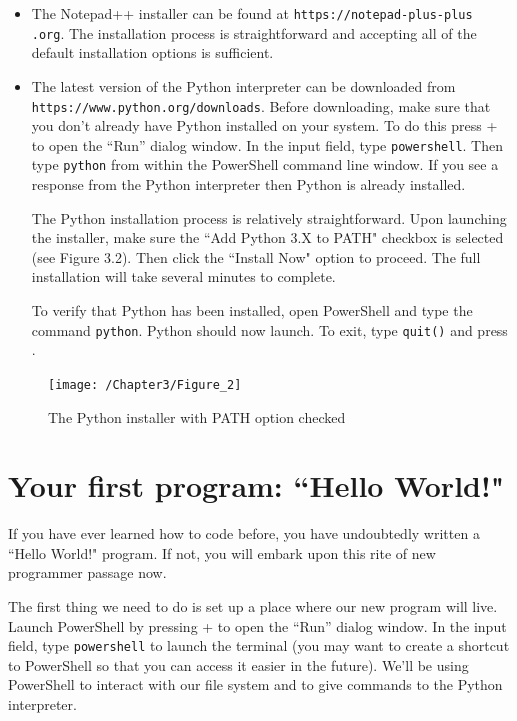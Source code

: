 \documentclass{book}
\begin{document}
\begin{itemize}
	\item The Notepad++ installer can be found at \texttt{https://notepad-plus-plus
		.org}. The installation process is straightforward and accepting all of the default installation options is sufficient.
	\item The latest version of the Python interpreter can be downloaded from 
	\texttt{https://www.python.org/downloads}. Before downloading, make sure that you don't already have Python installed on your system. To do this press  +  to open the ``Run'' dialog window. In the input field, type \texttt{powershell}. Then type \texttt{python} from within the PowerShell command line window. If you see a response from the Python interpreter then Python is already installed.
	
	The Python installation process is relatively straightforward. Upon launching the installer, make sure the ``Add Python 3.X to PATH" checkbox is selected (see Figure 3.2). Then click the ``Install Now" option to proceed. The full installation will take several minutes to complete.
	
	To verify that Python has been installed, open PowerShell and type the command \texttt{python}. Python should now launch. To exit, type \texttt{quit()} and press .
\end{itemize}

\begin{figure}[h]
	\caption{The Python installer with PATH option checked}
	\centering\texttt{[image: /Chapter3/Figure\_2]}
\end{figure}

\section{Your first program: ``Hello World!"}
If you have ever learned how to code before, you have undoubtedly written a ``Hello World!" program. If not, you will embark upon this rite of new programmer passage now.

The first thing we need to do is set up a place where our new program will live. Launch PowerShell by pressing  +  to open the ``Run'' dialog window. In the input field, type \texttt{powershell} to launch the terminal (you may want to create a shortcut to PowerShell so that you can access it easier in the future). We'll be using PowerShell to interact with our file system and to give commands to the Python interpreter.  
\end{document}
